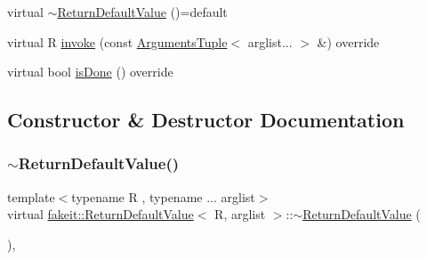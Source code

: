 \begin{DoxyCompactItemize}
\item 
virtual \mbox{\hyperlink{structfakeit_1_1ReturnDefaultValue_ae1985454992034296a118d73dbd21890}{$\sim$\+Return\+Default\+Value}} ()=default
\item 
virtual R \mbox{\hyperlink{structfakeit_1_1ReturnDefaultValue_a9b57c8c162e162b97415595f966e9c4a}{invoke}} (const \mbox{\hyperlink{namespacefakeit_a476a37a598825e1b5dd67b3a176491a1}{Arguments\+Tuple}}$<$ arglist... $>$ \&) override
\item 
virtual bool \mbox{\hyperlink{structfakeit_1_1ReturnDefaultValue_a7fbbfec578ab1944c73379d63185e06e}{is\+Done}} () override
\end{DoxyCompactItemize}


\subsection{Constructor \& Destructor Documentation}
\mbox{\label{structfakeit_1_1ReturnDefaultValue_ae1985454992034296a118d73dbd21890}} 
\subsubsection{\texorpdfstring{$\sim$ReturnDefaultValue()}{~ReturnDefaultValue()}\hspace{0.1cm}{\footnotesize\ttfamily [1/9]}}
{\footnotesize\ttfamily template$<$typename R , typename ... arglist$>$ \\
virtual \mbox{\hyperlink{structfakeit_1_1ReturnDefaultValue}{fakeit\+::\+Return\+Default\+Value}}$<$ R, arglist $>$\+::$\sim$\mbox{\hyperlink{structfakeit_1_1ReturnDefaultValue}{Return\+Default\+Value}} (\begin{DoxyParamCaption}{ }\end{DoxyParamCaption})\hspace{0.3cm}{\ttfamily [virtual]}, {\ttfamily [default]}}

\mbox{\label{structfakeit_1_1ReturnDefaultValue_ae1985454992034296a118d73dbd21890}} 
